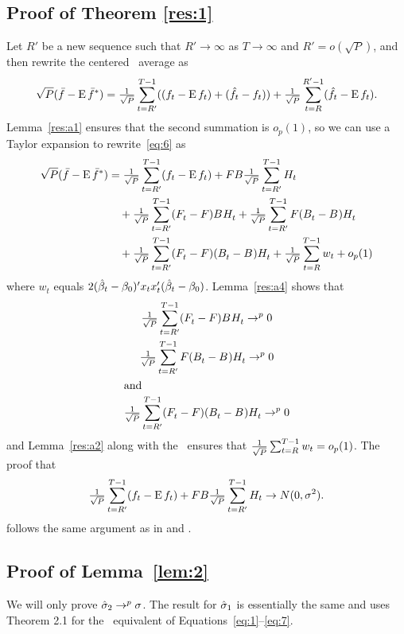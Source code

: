 \documentclass[12pt,fleqn]{article}
\begin{document}
\subsection{Proof of Theorem \ref{res:1}}
  Let $R'$ be a new sequence such that $R' \to \infty$ as $T \to \infty$
  and $R' = o(\sqrt{P})$, and then rewrite the centered \oos\ average as
  \begin{equation}\label{eq:6}
    \sqrt{P} (\bar{f} - \operatorname{E} \bar{f}^*)
    = \tfrac{1}{\sqrt{P}} \sum_{t=R'}^{T-1} ((f_t - \operatorname{E} f_t) + (\hat{f}_t - f_t))
      + \tfrac{1}{\sqrt{P}} \sum_{t=R}^{R'-1} (\hat{f}_t - \operatorname{E} f_t).
  \end{equation}
  Lemma~\ref{res:a1} ensures that the second summation is $o_p(1)$, so
  we can use a Taylor expansion to rewrite~\eqref{eq:6} as
  \begin{align*}
    \sqrt{P} (\bar{f} - \operatorname{E} \bar{f}^*)
    &= \tfrac{1}{\sqrt{P}} \sum_{t=R'}^{T-1} (f_t - \operatorname{E} f_t) + F B \tfrac{1}{\sqrt{P}} \sum_{t=R'}^{T-1} H_t \\
    & \quad + \tfrac{1}{\sqrt{P}} \sum_{t=R'}^{T-1} (F_t^{} - F) B^{} H_t^{} + \tfrac{1}{\sqrt{P}} \sum_{t=R'}^{T-1} F (B_t^{} - B^{}) H_t^{} \\ & \quad + \tfrac{1}{\sqrt{P}} \sum_{t=R'}^{T-1} (F_t^{} - F) (B_t^{} - B^{}) H_t^{} + \tfrac{1}{\sqrt{P}} \sum_{t=R}^{T-1} w_t + o_p(1)
  \end{align*}
  where $w_t$ equals $2 (\bh_t - \btrue)' x_t x_t' (\bh_t - \btrue)$.
  Lemma~\ref{res:a4} shows that
  \begin{gather}
    \tfrac{1}{\sqrt{P}} \sum_{t=R'}^{T-1} (F_t^{} - F) B^{} H_t^{} \to^{p} 0 \label{eq:11} \\
    \tfrac{1}{\sqrt{P}} \sum_{t=R'}^{T-1} F (B_t^{} - B^{}) H_t^{} \to^{p} 0 \label{eq:12} \\
    \intertext{and}
    \tfrac{1}{\sqrt{P}} \sum_{t=R'}^{T-1} (F_t^{} - F) (B_t^{} - B^{}) H_t^{} \to^{p} 0 \label{eq:13}
  \end{gather}
  and Lemma~\ref{res:a2} along with the \clt\ ensures that $\tfrac{1}{\sqrt{P}} \sum_{t=R}^{T-1}
  w_t = o_{p}(1)$. The proof that
  \begin{equation*}
    \tfrac{1}{\sqrt{P}} \sum_{t=R'}^{T-1} (f_t - \operatorname{E} f_t) + F B \tfrac{1}{\sqrt{P}} \sum_{t=R'}^{T-1} H_t \to N(0, \sigma^2).
  \end{equation*}
  follows the same argument as in \citet{Wes:96} and \citet{Mcc:00}.

\subsection{Proof of Lemma~\ref{lem:2}}

We will only prove $\hat\sigma_2 \to^p \sigma$. The result for
$\hat\sigma_1$ is essentially the same and uses  Theorem
2.1 for the \hac\ equivalent of Equations~\eqref{eq:1}--\eqref{eq:7}.
\end{document}
